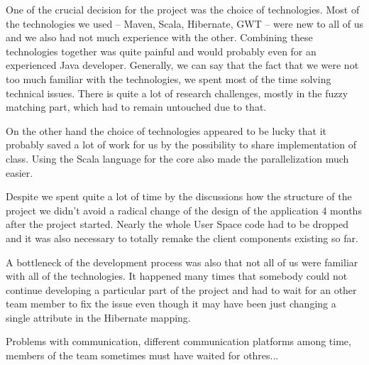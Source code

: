 One of the crucial decision for the project was the choice of technologies. Most of the technologies we used -- Maven, Scala, Hibernate, GWT -- were new to all of us and we also had not much experience with the other. Combining these technologies together was quite painful and would probably even for an experienced Java developer. Generally, we can say that the fact that we were not too much familiar with the technologies, we spent most of the time solving technical issues. There is quite a lot of research challenges, mostly in the fuzzy matching part, which had to remain untouched due to that.

On the other hand the choice of technologies appeared to be lucky that it probably saved a lot of work for us by the possibility to share implementation of class. Using the Scala language for the core also made the parallelization much easier.

Despite we spent quite a lot of time by the discussions how the structure of the project we didn't avoid a radical change of the design of the application 4 months after the project started. Nearly the whole User Space code had to be dropped and it was also necessary to totally remake the client components existing so far.

A bottleneck of the development process was also that not all of us were familiar with all of the technologies. It happened many times that somebody could not continue developing a particular part of the project and had to wait for an other team member to fix the issue even though it may have been just changing a single attribute in the Hibernate mapping.

Problems with communication, different communication platforms among time, members of the team sometimes must have waited for othres...



